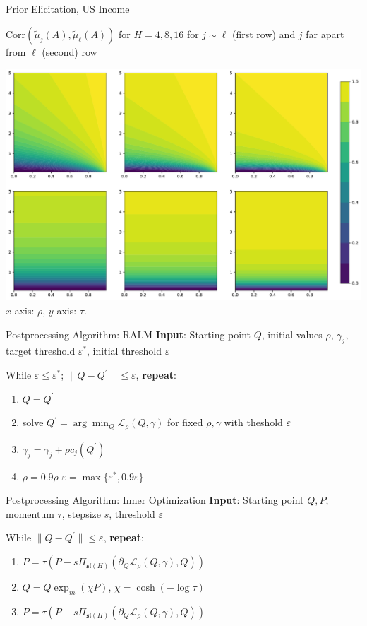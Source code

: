 \documentclass[10.5pt, aspectratio=169]{beamer} %
\newcommand{\mutilde}{\widetilde{\mu}}
\begin{document}
\begin{frame}{Prior Elicitation, US Income}

$\mbox{Corr}(\mutilde_j(A), \mutilde_\ell(A))$ for $H=4, 8, 16$ for $j \sim \ell$ (first row) and $j$ far apart from $\ell$ (second) row

\begin{center}
	\includegraphics[width=0.6\linewidth]{corr_lgmrf} \\
	$x$-axis: $\rho$, $y$-axis: $\tau$.
\end{center}

\end{frame}


\begin{frame}{Postprocessing Algorithm: RALM}
\textbf{Input}: Starting point $Q$, initial values $\rho$, $\gamma_{j}$, target threshold $\varepsilon^*$, initial threshold $\varepsilon$

\bigskip

While $\varepsilon \leq \varepsilon^*$; $\|Q - Q^\prime\| \leq \varepsilon$, \textbf{repeat}:

\bigskip
\begin{enumerate}
	\setlength{\itemsep}{1.5em}
	\item $Q = Q^\prime$ 
	\item	solve $Q^\prime = \arg\min_Q \mathcal L_\rho(Q, \gamma)$ for fixed $\rho, \gamma$ with theshold $\varepsilon$  	
	\item $\gamma_j = \gamma_j + \rho c_j(Q^\prime)$
	\item $\rho = 0.9 \rho$ $\varepsilon = \max\{\varepsilon^*, 0.9 \varepsilon\}$
	\end{enumerate}
\end{frame}



\begin{frame}{Postprocessing Algorithm: Inner Optimization}
\textbf{Input}: Starting point $Q, P$, momentum $\tau$, stepsize $s$, threshold $\varepsilon$

\bigskip

While $\|Q - Q^\prime\| \leq \varepsilon$, \textbf{repeat}:

\bigskip
\begin{enumerate}
	\setlength{\itemsep}{1.5em}
	\item $P = \tau \left(P - s \Pi_{\mathfrak {sl}(H)}(\partial_Q \mathcal L_\rho(Q, \gamma), Q)\right)$
	\item	$Q = Q \exp_m(\chi P )$, $\chi = \cosh(- \log \tau)$
	\item	$P = \tau \left(P - s \Pi_{\mathfrak {sl}(H)}(\partial_Q \mathcal L_\rho(Q, \gamma), Q)\right)$ 
\end{enumerate}
\end{frame}
\end{document}
